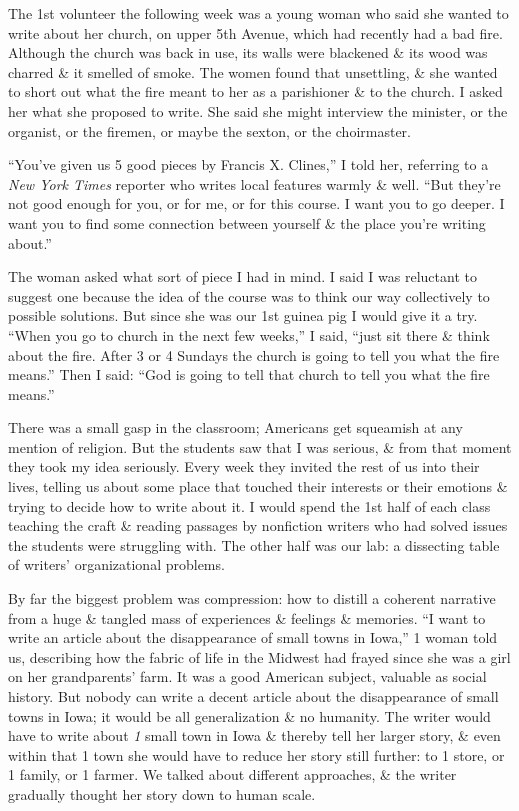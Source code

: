 \documentclass{article}
\numberwithin{equation}{section}
\begin{document}
The 1st volunteer the following week was a young woman who said she wanted to write about her church, on upper 5th Avenue, which had recently had a bad fire. Although the church was back in use, its walls were blackened \& its wood was charred \& it smelled of smoke. The women found that unsettling, \& she wanted to short out what the fire meant to her as a parishioner \& to the church. I asked her what she proposed to write. She said she might interview the minister, or the organist, or the firemen, or maybe the sexton, or the choirmaster.

``You've given us 5 good pieces by Francis X. Clines,'' I told her, referring to a \textit{New York Times} reporter who writes local features warmly \& well. ``But they're not good enough for you, or for me, or for this course. I want you to go deeper. I want you to find some connection between yourself \& the place you're writing about.''

The woman asked what sort of piece I had in mind. I said I was reluctant to suggest one because the idea of the course was to think our way collectively to possible solutions. But since she was our 1st guinea pig I would give it a try. ``When you go to church in the next few weeks,'' I said, ``just sit there \& think about the fire. After 3 or 4 Sundays the church is going to tell you what the fire means.'' Then I said: ``God is going to tell that church to tell you what the fire means.''

There was a small gasp in the classroom; Americans get squeamish at any mention of religion. But the students saw that I was serious, \& from that moment they took my idea seriously. Every week they invited the rest of us into their lives, telling us about some place that touched their interests or their emotions \& trying to decide how to write about it. I would spend the 1st half of each class teaching the craft \& reading passages by nonfiction writers who had solved issues the students were struggling with. The other half was our lab: a dissecting table of writers' organizational problems.

By far the biggest problem was compression: how to distill a coherent narrative from a huge \& tangled mass of experiences \& feelings \& memories. ``I want to write an article about the disappearance of small towns in Iowa,'' 1 woman told us, describing how the fabric of life in the Midwest had frayed since she was a girl on her grandparents' farm. It was a good American subject, valuable as social history. But nobody can write a decent article about the disappearance of small towns in Iowa; it would be all generalization \& no humanity. The writer would have to write about \textit{1} small town in Iowa \& thereby tell her larger story, \& even within that 1 town she would have to reduce her story still further: to 1 store, or 1 family, or 1 farmer. We talked about different approaches, \& the writer gradually thought her story down to human scale.
\end{document}
